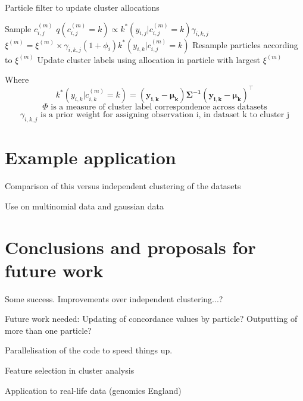 \documentclass[10pt,a4paper]{report}
\begin{document}
\begin{algorithm}
\caption{Particle filter to update cluster allocations}
\label{alg:pf}
 \begin{algorithmic}[1]
   
   
   
  \State Sample $c^{(m)}_{i, j}$ 
  \State $q(c^{(m)}_{i,j} = k) \propto k^*(y_{i,j}|c_{i,j}^{(m)} = k) \gamma_{i, k, j}$ 
  \State $\xi^{(m)} =  \xi^{(m)} \times \gamma_{i, k, j}(1+\phi_{i})k^*(y_{i,k}|c_{i,j}^{(m)} = k)$ 
  \EndFor
  \EndFor
  \State Resample particles according to $\xi^{(m)}$
  \EndFor
  \State Update cluster labels using allocation in particle with largest $\xi^{(m)}$

\end{algorithmic}
\end{algorithm}

Where
\begin{equation}
\label{eq:likelihood}
k^*(y_{i, k}|c_{i, k}^{(m)} = k) = (\mathbf{y_{i, k}} - \mathbf{\mu_k}) \mathbf{\Sigma^{-1}} (\mathbf{y_{i, k}} - \mathbf{\mu_k})^\top
\end{equation}
\begin{equation}
\label{eq:phi}
\Phi \text{ is a measure of cluster label correspondence across datasets}
\end{equation}
\begin{equation}
\label{eq:gamma}
\gamma_{i, k, j} \text{ is a prior weight for assigning observation i, in dataset k to cluster j}
\end{equation}
\section{Example application}
Comparison of this versus independent clustering of the datasets

Use on multinomial data and gaussian data


\section{Conclusions and proposals for future work}
Some success. Improvements over independent clustering...?

Future work needed: Updating of concordance values by particle? Outputting of more than one particle?

Parallelisation of the code to speed things up.

Feature selection in cluster analysis

Application to real-life data (genomics England)







\end{document}
